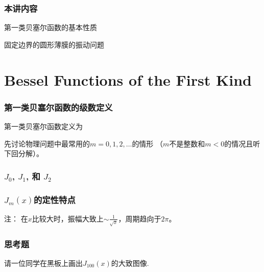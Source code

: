\documentclass[CJK]{beamer}
\date{}
\begin{document}
  \bch
{}

\begin{frame}
\frametitle{本讲内容}

\bitem
\item{第一类贝塞尔函数的基本性质}
\item{固定边界的圆形薄膜的振动问题}    
\eitem

\end{frame}

\section{Bessel Functions of the First Kind}

\begin{frame}
  \frametitle{第一类贝塞尔函数的级数定义}
  
  第一类贝塞尔函数定义为

  先讨论物理问题中最常用的$m=0,1,2,\ldots$的情形 （$m$不是整数和$m<0$的情况且听下回分解）。

  
\end{frame}


\begin{frame}
  \frametitle{$J_0$, $J_1$, 和 $J_2$}
  
  
\end{frame}

\begin{frame}
  \frametitle{$J_m(x)$的定性特点}
  
 注： 在$x$比较大时，振幅大致上$\sim \frac{1}{\sqrt{x}}$，周期趋向于$2\pi$。
  
\end{frame}


\begin{frame}
  \frametitle{思考题}
  
  请一位同学在黑板上画出$J_{100}(x)$的大致图像.
  
\end{frame}
\end{document}
